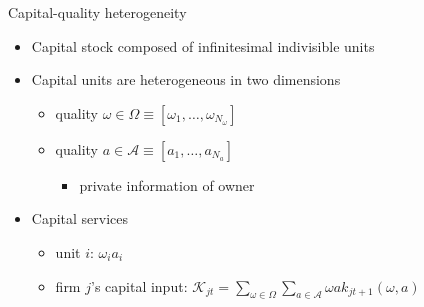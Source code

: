 \documentclass[english,xcolor=svgnames,aspectratio=169]{beamer}
\begin{document}
\begin{frame}{Capital-quality heterogeneity}

\begin{itemize}
\item  Capital stock composed of infinitesimal indivisible units  \medskip

\item Capital units are heterogeneous in two dimensions \medskip

   \begin{itemize}
    \item {\color{dblue}{observed}} quality $\omega\in\Omega \equiv \left[\omega_1,\ldots,\omega_{N_\omega}\right]$ \medskip
    \item {\color{dred}{unobserved}} quality $a\in\mathcal{A}\equiv \left[a_1,\ldots,a_{N_a}\right]$\smallskip
    \begin{itemize}
    \item private information of owner
\end{itemize}
    \end{itemize}
    \medskip
    \item Capital services \smallskip
    \begin{itemize}
   \item  unit $i$: $\omega_{i} a_{i}$ \smallskip
    \item firm $j$'s capital input: $\mathcal K_{jt} ={\sum_{\omega  \in \Omega }} {\sum_{ a  \in \mathcal A}} \omega a k_{jt+1}(\omega, a)$
    \end{itemize}
\end{itemize}

\end{frame}

\end{document}
